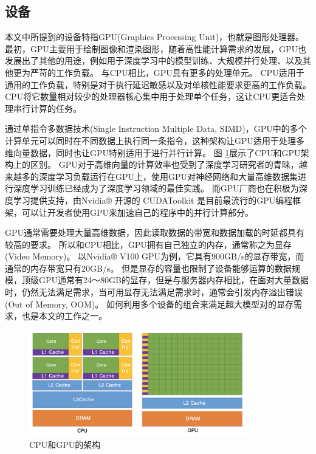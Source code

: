\subsection{设备}
本文中所提到的设备特指GPU(Graphics Processing Unit)，也就是图形处理器。
最初，GPU主要用于绘制图像和渲染图形，随着高性能计算需求的发展，GPU也发展出了其他的用途，例如用于深度学习中的模型训练、大规模并行处理、以及其他更为严苛的工作负载。
与CPU相比，GPU具有更多的处理单元。
CPU适用于通用的工作负载，特别是对于执行延迟敏感以及对单核性能要求更高的工作负载。
CPU将它数量相对较少的处理器核心集中用于处理单个任务，这让CPU更适合处理串行计算的任务。

通过单指令多数据技术(Single Instruction Multiple Data, SIMD)，GPU中的多个计算单元可以同时在不同数据上执行同一条指令，这种架构让GPU适用于处理多维向量数据，同时也让GPU特别适用于进行并行计算。
图 \ref{fig:cpu-gpu}展示了CPU和GPU架构上的区别。
GPU对于高维向量的计算效率也受到了深度学习研究者的青睐，越来越多的深度学习负载运行在GPU上，使用GPU对神经网络和大量高维数据集进行深度学习训练已经成为了深度学习领域的最佳实践。
而GPU厂商也在积极为深度学习提供支持，由Nvidia® 开源的 CUDAToolkit 是目前最流行的GPU编程框架，可以让开发者使用GPU来加速自己的程序中的并行计算部分。

GPU通常需要处理大量高维数据，因此读取数据的带宽和数据加载的时延都具有较高的要求。
所以和CPU相比，GPU拥有自己独立的内存，通常称之为显存(Video Memory)。
以Nvidia® V100 GPU为例，它具有900GB/s的显存带宽，而通常的内存带宽只有20GB/s。
但是显存的容量也限制了设备能够运算的数据规模，顶级GPU通常有24～80GB的显存，但是与服务器内存相比，在面对大量数据时，仍然无法满足需求，当可用显存无法满足需求时，通常会引发内存溢出错误(Out of Memory, OOM)。
如何利用多个设备的组合来满足超大模型对的显存需求，也是本文的工作之一。

\begin{figure}[h]
	\centering
	\includegraphics[width=0.85\textwidth]{figure/2-background/cpu-gpu.png}
	\caption{CPU和GPU的架构}
	\label{fig:cpu-gpu}
\end{figure}

